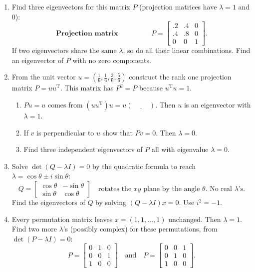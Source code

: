 \documentclass[14pt, a4paper]{article}
\begin{document}
\begin{enumerate}
    \item Find three eigenvectors for this matrix $P$ (projection matrices have $\lambda = 1$ and $0$):
          \[
              \textbf{Projection matrix} \hspace{2cm} P = \begin{bmatrix} .2 & .4 & 0 \\ .4 & .8 & 0 \\ 0 & 0 & 1 \end{bmatrix} .
          \]
          If two eigenvectors share the same $\lambda$, so do all their linear combinations. Find an eigenvector of $P$ with no zero components.

    \item From the unit vector ${u} = \left(\frac{1}{6}, \frac{1}{6}, \frac{3}{6}, \frac{5}{6}\right)$ construct the rank one projection matrix $P = {u}{u}^{\mathrm{T}}$. This matrix has $P^2 = P$ because ${u}^{\mathrm{T}}{u} = 1$.
          \begin{enumerate}
              \item $P{u} = {u}$ comes from $({u}{u}^{\mathrm{T}}){u} = {u}(\underline{\hspace{1cm}})$. Then ${u}$ is an eigenvector with $\lambda = 1$.
              \item If ${v}$ is perpendicular to ${u}$ show that $P{v} = {0}$. Then $\lambda = 0$.
              \item Find three independent eigenvectors of $P$ all with eigenvalue $\lambda = 0$.
          \end{enumerate}

    \item Solve $\det(Q - \lambda I) = 0$ by the quadratic formula to reach $\lambda = \cos \theta \pm i \sin \theta$:
          \[
              Q = \begin{bmatrix} \cos \theta & -\sin \theta \\ \sin \theta & \cos \theta \end{bmatrix} \quad \text{rotates the } xy \text{ plane by the angle } \theta. \text{ No real } \lambda \text{'s}.
          \]
          Find the eigenvectors of $Q$ by solving $(Q - \lambda I){x} = {0}$. Use $i^2 = -1$.

    \item Every permutation matrix leaves ${x} = (1, 1, \dots, 1)$ unchanged. Then $\lambda = 1$. Find two more $\lambda$'s (possibly complex) for these permutations, from $\det(P - \lambda I) = 0$:
          \[
              P = \begin{bmatrix} 0 & 1 & 0 \\ 0 & 0 & 1 \\ 1 & 0 & 0 \end{bmatrix} \quad \text{and} \quad P = \begin{bmatrix} 0 & 0 & 1 \\ 0 & 1 & 0 \\ 1 & 0 & 0 \end{bmatrix} .
          \]


\end{enumerate}
\end{document}
